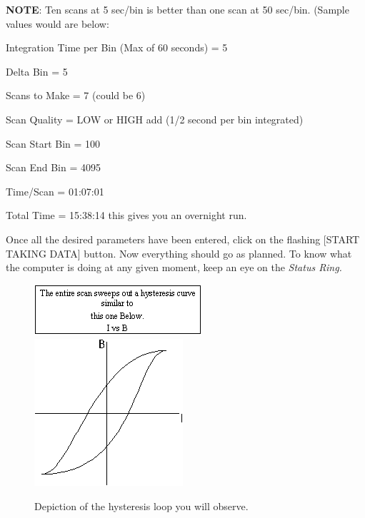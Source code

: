 \documentclass{../lab}
\begin{document}
\textbf{NOTE}: Ten scans at 5 sec/bin is better than one scan at 50 sec/bin. (Sample values would are below:

Integration Time per Bin (Max of 60 seconds) = 5

Delta Bin = 5

Scans to Make = 7 (could be 6)

Scan Quality = LOW or HIGH add (1/2 second per bin integrated)

Scan Start Bin = 100

Scan End Bin = 4095

Time/Scan = 01:07:01

Total Time = 15:38:14 this gives you an overnight run.

Once all the desired parameters have been entered, click on the flashing [START TAKING DATA] button. Now everything should go as planned. To know what the computer is doing at any given moment, keep an eye on the \emph{Status Ring.}


\begin{figure}[h]
    \centering
    \href{http://experimentationlab.berkeley.edu/sites/default/files/images/BRAimage032.gif}{\includegraphics[width=0.5\linewidth]{images/BRAimage032.png}}
    \href{http://experimentationlab.berkeley.edu/sites/default/files/images/BRAimage034.gif}{\includegraphics[width=0.5\linewidth]{images/BRAimage034.png}}
    \caption{Depiction of the hysteresis loop you will observe.}
\end{figure}
\end{document}

